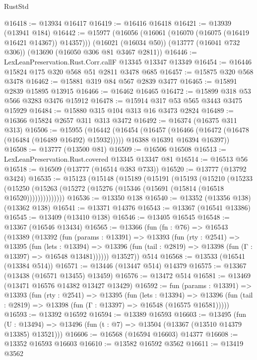 \begin{lexlean}{RustStd}
\begin{coremodule}
@16418 := @13934 @16417
@16419 := @16416 @16418
@16421 := @13939 (@13941 @184)
@16442 := @15977
    (@16056 (@16061 (@16070 (@16075 (@16419 @16421 @14367)) @14357)))
    (@16021 (@16034 @50))
    (@13777 (@16041 @732 @306))
    (@13690 (@16050 @306 @81 @3467 @2811))
@16446 := LexLeanPreservation.Rust.Corr.callF @13345 @13347 @13349
@16454 := @16446 @15824 @175 @320 @568 @51 @2811 @3478 @685
@16457 := @15875 @320 @568 @3478
@16462 := @15881 @319 @84 @567 @2839 @3477
@16465 := @15891 @2839 @15895 @13915
@16466 := @16462 @16465
@16472 := @15899 @318 @53 @566 @3283 @3476 @15912
@16478 := @15914 @317 @53 @565 @3443 @3475 @15929
@16484 := @15880 @315 @104 @313 @16 @3473 @2824
@16489 := @16366 @15824 @2657 @311 @313 @3472
@16492 := @16374 (@16375 @311 @313)
@16506 := @15955
    (@16442
      (@16454
        (@16457 (@16466 (@16472 (@16478 (@16484 (@16489 @16492) @15932)))))
        @16388
        @16391
        @16394
        @16397))
@16508 := @13777 (@13500 @81)
@16509 := @16506 @16508
@16513 := LexLeanPreservation.Rust.covered @13345 @13347 @81
@16514 := @16513 @56
@16518 := @16509 (@13777 (@16514 @383 @733))
@16520 := @13777 (@13792 @3424)
@16535 := @15123
    (@15148
      (@15189
        (@15191
          (@15193
            (@15210
              (@15233
                (@15250 (@15263 (@15272 (@15276 (@15346 (@15691 (@15814 (@16518 @16520))))))))))))))
@16536 := @13350 @138
@16540 := @13352 (@13356 @138) (@13362 @138)
@16541 := @13371 @14376
@16543 := @13367 (@16541 @13386)
@16545 := @13409 (@13410 @138)
@16546 := @13405 @16545
@16548 := @13367 (@16546 @13434)
@16565 := @13366
    (fun (fn : @76) =>
    @16543
      (@13389
        (@13392
          (fun (params : @13391) =>
          @13393
            (fun (rty : @2541) =>
            @13395
              (fun (lets : @13394) =>
              @13396 (fun (tail : @2819) => @13398 (fun (Γ : @13397) => @16548 @13481))))))
        @13527))
    @514
@16568 := @13533 (@16541 (@13384 @514))
@16571 := @13446 (@13447 @514) @14379
@16575 := @13367 (@13438 (@16571 @13455) @13459)
@16576 := @13472 @514
@16581 := @13469 (@13471 @16576 @14382 @13427 @13429)
@16592 := fun (params : @13391) =>
  @13393
    (fun (rty : @2541) =>
    @13395
      (fun (lets : @13394) =>
      @13396 (fun (tail : @2819) => @13398 (fun (Γ : @13397) => @16548 (@16575 @16581)))))
@16593 := @13392 @16592
@16594 := @13389 @16593
@16603 := @13495
    (fun (U : @13494) => @13496 (fun (t : @7) => @13504 (@13367 (@13510 @14379 @13385) @13521)))
@16606 := @16568 (@16594 @16603) @14377
@16608 := @13352 @16593 @16603
@16610 := @13582 @16592 @3562
@16611 := @13419 @3562

\end{coremodule}
\end{lexlean}
